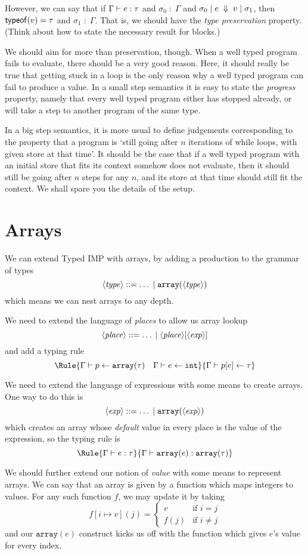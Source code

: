 \documentclass{article}
\begin{document}
However, we can say that if $\Gamma \vdash e : \tau$ and $\sigma_0\;:\;\Gamma$
and $\sigma_0 \;|\; e \;\Downarrow\; v \;|\; \sigma_1$, then $\mathsf{typeof}(v) = \tau$ and $\sigma_1\;:\;\Gamma$.
That is, we should have the \emph{type preservation} property. (Think about
how to state the necessary result for blocks.)

We should aim for more than preservation, though. When a well typed program fails to evaluate, there should be a very good reason. Here, it should really be true
that getting stuck in a loop is the only reason why a well typed program can fail to produce a value. In a small step semantics it is easy to state the \emph{progress} property, namely that every well typed program either has stopped already, or will take a step to another program of the same type.

In a big step
semantics, it is more usual to define judgements corresponding to the property
that a program is `still going after $n$ iterations of while loops, with given
store at that time'. It should be the case that if a well typed program with an initial store that fits its context somehow does not evaluate, then it should still be going after $n$ steps for any $n$, and its store at that time should still fit the context.
We shall spare you the details of the setup.


\section{Arrays}

\newcommand{\arr}[1]{\mathtt{array}(#1)}
We can extend Typed IMP with arrays, by adding a production to the grammar
of types
\[
\NT{type} ::= \ldots \;|\; \arr{\NT{type}}
\]
which means we can nest arrays to any depth.

We need to extend the language of \emph{places} to allow us array lookup
\[
  \langle \mathit{place} \rangle ::= \ldots \;|\; \langle \mathit{place} \rangle[\langle \mathit{exp} \rangle]
\]
and add a typing rule
\[\Rule{\JPl\Gamma p{\arr{\tau}}\quad \JPl\Gamma e\intg}
       {\JPl\Gamma{p[e]}\tau}
\]

We need to extend the language of expressions with some means to
create arrays. One way to do this is
\[
  \NT{exp} ::= \ldots \;|\; \arr{\NT{exp}}
\]
which creates an array whose \emph{default} value in every place is the value of the expression, so the typing rule is
\[
  \Rule{\JEx\Gamma e\tau}
       {\JEx\Gamma{\arr{e}}{\arr{\tau}}}
\]
     
We should further extend our notion of \emph{value} with some means to represent arrays. We can say that an array is given by a function which maps integers to values. For any such function $f$, we may update it by taking
\[f[i\mapsto v](j) = \left\{\begin{array}{ll}
                              v & \mbox{if $i = j$} \\
                              f(j) & \mbox{if $i \neq j$}
                              \end{array}\right.
\]
and our $\arr{e}$ construct kicks us off with the function which gives
$e$'s value for every index.
\end{document}
